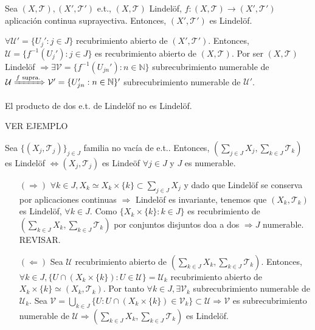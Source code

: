 \begin{prop}
  Sea $( X, \mathcal{T} ), ( X', \mathcal{T}' )$ e.t., $( X, \mathcal{T} )$ Lindelöf, $f : ( X, \mathcal{T} ) \to ( X', \mathcal{T}' )$ aplicación continua suprayectiva. Entonces, $( X', \mathcal{T}' )$ es Lindelöf.
\end{prop}

\begin{dem}
  $\forall \mathcal{U}' = \{ U_{j}' : j \in J \}$ recubrimiento abierto de $( X', \mathcal{T}' )$. Entonces, $ \mathcal{U} = \{  f^{-1}(U_{j}') : j \in J \}$ es recubrimiento abierto de $( X, \mathcal{T} )$. Por ser $( X, \mathcal{T} )$ Lindelöf $\Rightarrow \exists \mathcal{V} = \{  f^{-1}(U_{jn}') : n \in \mathbb{N} \}$ subrecubrimiento numerable de $\mathcal{U} \xRightarrow[]{ f \text{ supra.} } \mathcal{V}' = \{  U_{jn}' : n \in \mathbb{N} \}'$ subrecubrimiento numerable de $\mathcal{U}'$.
\end{dem}

\begin{obs}
  El producto de dos e.t. de Lindelöf no es Lindelöf.
\end{obs}

\begin{ejm}
  VER EJEMPLO
\end{ejm}

\begin{prop}
  Sea $\{ ( X_{j}, \mathcal{T}_{j} ) \}_{j \in J}$ familia no vacía de e.t.. Entonces, $( \sum_{j \in J} X_{j}, \sum_{k \in J} \mathcal{T}_{k})$ es Lindelöf $\Leftrightarrow ( X_{j}, \mathcal{T}_{j} )$ es Lindeöf $\forall j \in J$ y $J $ es numerable.
\end{prop}

\begin{dem}
  \begin{enumerate}[label=(\roman*)]
    \item []
    \item [$(\Rightarrow)$] $\forall k \in J, X_{k} \simeq X_{k} \times \{ k \} \subset \sum_{j \in J} X_{j}$ y dado que Lindelöf se conserva por aplicaciones continuas $\Rightarrow$ Lindelöf es invariante, tenemos que $( X_{k}, \mathcal{T}_{k} )$ es Lindelöf, $\forall k \in J$. Como $\{ X_{k} \times \{ k \} : k \in J \}$ es recubrimiento de $( \sum_{k \in J} X_{k}, \sum_{k \in J} \mathcal{T}_{k})$ por conjuntos disjuntos doa a dos $\Rightarrow J$ numerable. REVISAR.
    \item [$(\Leftarrow)$] Sea $\mathcal{U}$ recubrimiento abierto de $( \sum_{k \in J} X_{k}, \sum_{k \in J} \mathcal{T}_{k})$. Entonces, $\forall k \in J, \{  U \cap ( X_{k} \times \{ k \} ) :  U \in \mathcal{U} \} = \mathcal{U}_{k}$ recubrimiento abierto de $X_{k} \times \{ k \} \simeq ( X_{k}, \mathcal{T}_{k} )$. Por tanto $\forall k \in J, \exists \mathcal{V}_{k}$ subrecubrimiento numerable de $\mathcal{U}_{k}$. Sea $ \mathcal{V} = \bigcup_{k \in J} \{ U : U \cap ( X_{k} \times \{ k \} ) \in \mathcal{V}_{k} \} \subset \mathcal{U} \Rightarrow \mathcal{V}$ es subrecubrimiento numerable de $\mathcal{U} \Rightarrow ( \sum_{k \in J} X_{k}, \sum_{k \in J} \mathcal{T}_{k})$ es Lindelöf.
  \end{enumerate}
\end{dem}
